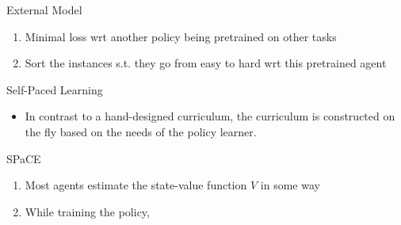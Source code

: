 \begin{frame}[c]{External Model}
	
	\begin{enumerate}
		\item Minimal loss wrt another policy being pretrained on other tasks
		\item Sort the instances s.t. they go from easy to hard wrt this pretrained agent~
	\end{enumerate}
	
\end{frame}
\begin{frame}[c]{Self-Paced Learning}
	
	\begin{itemize}
		\item In contrast to a hand-designed curriculum, the curriculum is constructed on the fly based on the needs of the policy learner.
	\end{itemize}

	
\end{frame}
\begin{frame}[c]{SPaCE~}
	
	\begin{enumerate}
		\item Most agents estimate the state-value function $V$ in some way
		\item While training the policy, 
	\end{enumerate}
	
\end{frame}


